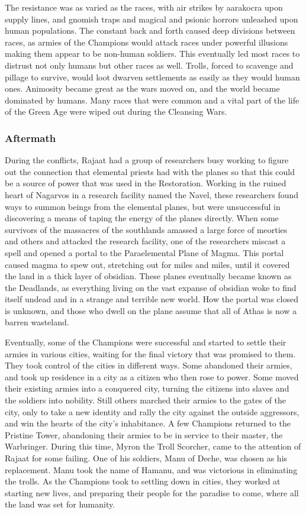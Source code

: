 The resistance was as varied as the races, with air strikes by aarakocra upon supply lines, and gnomish traps and magical and psionic horrors unleashed upon human populations. The constant back and forth caused deep divisions between races, as armies of the Champions would attack races under powerful illusions making them appear to be non-human soldiers. This eventually led most races to distrust not only humans but other races as well. Trolls, forced to scavenge and pillage to survive, would loot dwarven settlements as easily as they would human ones. Animosity became great as the wars moved on, and the world became dominated by humans. Many races that were common and a vital part of the life of the Green Age were wiped out during the Cleansing Wars.

\subsubsection{Aftermath}
During the conflicts, Rajaat had a group of researchers busy working to figure out the connection that elemental priests had with the planes so that this could be a source of power that was used in the Restoration. Working in the ruined heart of Nagarvos in a research facility named the Navel, these researchers found ways to summon beings from the elemental planes, but were unsuccessful in discovering a means of taping the energy of the planes directly. When some survivors of the massacres of the southlands amassed a large force of meorties and others and attacked the research facility, one of the researchers miscast a  spell and opened a portal to the Paraelemental Plane of Magma. This portal caused magma to spew out, stretching out for miles and miles, until it covered the land in a thick layer of obsidian. These planes eventually became known as the Deadlands, as everything living on the vast expanse of obsidian woke to find itself undead and in a strange and terrible new world. How the portal was closed is unknown, and those who dwell on the plane assume that all of Athas is now a barren wasteland.

Eventually, some of the Champions were successful and started to settle their armies in various cities, waiting for the final victory that was promised to them. They took control of the cities in different ways. Some abandoned their armies, and took up residence in a city as a citizen who then rose to power. Some moved their existing armies into a conquered city, turning the citizens into slaves and the soldiers into nobility. Still others marched their armies to the gates of the city, only to take a new identity and rally the city against the outside aggressors, and win the hearts of the city's inhabitance. A few Champions returned to the Pristine Tower, abandoning their armies to be in service to their master, the Warbringer. During this time, Myron the Troll Scorcher, came to the attention of Rajaat for some failing. One of his soldiers, Manu of Deche, was chosen as his replacement. Manu took the name of Hamanu, and was victorious in eliminating the trolls. As the Champions took to settling down in cities, they worked at starting new lives, and preparing their people for the paradise to come, where all the land was set for humanity.

